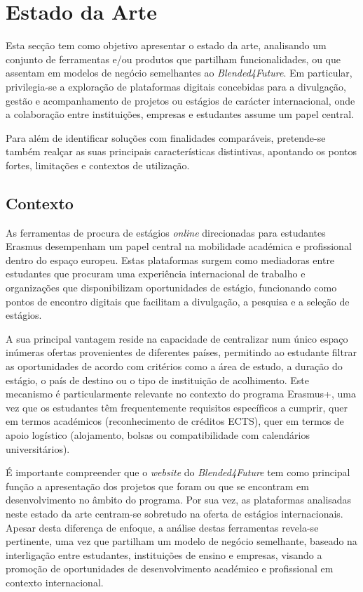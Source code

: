 \chapter{Estado da Arte}
\label{chap:estadodaarte}

Esta secção tem como objetivo apresentar o estado da arte, analisando um conjunto de ferramentas e/ou produtos que partilham funcionalidades, ou que assentam em modelos de negócio semelhantes ao \textit{Blended4Future}. Em particular, privilegia-se a exploração de plataformas digitais concebidas para a divulgação, gestão e acompanhamento de projetos ou estágios de carácter internacional, onde a colaboração entre instituições, empresas e estudantes assume um papel central.

Para além de identificar soluções com finalidades comparáveis, pretende-se também realçar as suas principais características distintivas, apontando os pontos fortes, limitações e contextos de utilização.

\section{Contexto}

As ferramentas de procura de estágios \textit{online} direcionadas para estudantes Erasmus desempenham um papel central na mobilidade académica e profissional dentro do espaço europeu. Estas plataformas surgem como mediadoras entre estudantes que procuram uma experiência internacional de trabalho e organizações que disponibilizam oportunidades de estágio, funcionando como pontos de encontro digitais que facilitam a divulgação, a pesquisa e a seleção de estágios.

A sua principal vantagem reside na capacidade de centralizar num único espaço inúmeras ofertas provenientes de diferentes países, permitindo ao estudante filtrar as oportunidades de acordo com critérios como a área de estudo, a duração do estágio, o país de destino ou o tipo de instituição de acolhimento. Este mecanismo é particularmente relevante no contexto do programa Erasmus+, uma vez que os estudantes têm frequentemente requisitos específicos a cumprir, quer em termos académicos (reconhecimento de créditos ECTS), quer em termos de apoio logístico (alojamento, bolsas ou compatibilidade com calendários universitários).

É importante compreender que o \textit{website} do \textit{Blended4Future} tem como principal função a apresentação dos projetos que foram ou que se encontram em desenvolvimento no âmbito do programa. Por sua vez, as plataformas analisadas neste estado da arte centram-se sobretudo na oferta de estágios internacionais. Apesar desta diferença de enfoque, a análise destas ferramentas revela-se pertinente, uma vez que partilham um modelo de negócio semelhante, baseado na interligação entre estudantes, instituições de ensino e empresas, visando a promoção de oportunidades de desenvolvimento académico e profissional em contexto internacional.

